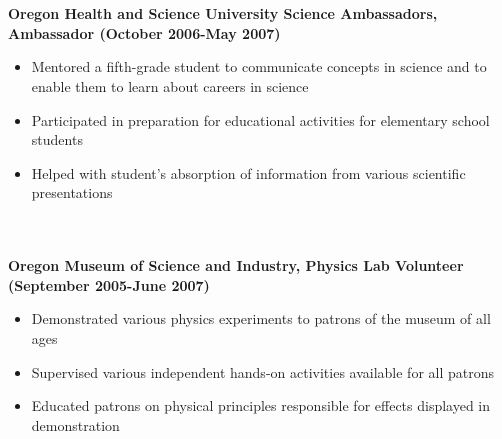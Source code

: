 \documentclass{article}
\begin{document}
\phantom \\
\phantom \\
%
%
%
%
\noindent \textbf{Oregon Health and Science University Science Ambassadors, Ambassador (October 2006-May 2007)}
\phantom \\
\begin{itemize}
\item Mentored a fifth-grade student to communicate concepts in science and to enable them to learn about careers in science
\item Participated in preparation for educational activities for elementary school students
\item Helped with student’s absorption of information from various scientific presentations
\end{itemize}
\phantom \\
\phantom \\
%
%
%
%
\noindent \textbf{Oregon Museum of Science and Industry, Physics Lab Volunteer (September 2005-June 2007)}
\phantom \\
\begin{itemize}
\item Demonstrated various physics experiments to patrons of the museum of all ages
\item Supervised various independent hands-on activities available for all patrons
\item Educated patrons on physical principles responsible for effects displayed in demonstration
\end{itemize}
\phantom \\
\phantom \\
%
%
%
%
\par
\phantom \\
\phantom \\
\end{document}
